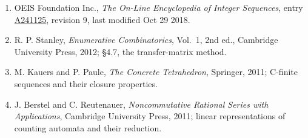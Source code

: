 \documentclass[11pt]{article}
\theoremstyle{definition}
\begin{document}
\begin{enumerate}

\item OEIS Foundation Inc., \emph{The On-Line Encyclopedia of Integer Sequences}, entry \href{https://oeis.org/A241125}{A241125}, revision 9, last modified Oct 29 2018.

\item R. P. Stanley, \emph{Enumerative Combinatorics}, Vol.~1, 2nd ed., Cambridge University Press, 2012; \S4.7, the transfer-matrix method.

\item M. Kauers and P. Paule, \emph{The Concrete Tetrahedron}, Springer, 2011; C-finite sequences and their closure properties.

\item J. Berstel and C. Reutenauer, \emph{Noncommutative Rational Series with Applications}, Cambridge University Press, 2011; linear representations of counting automata and their reduction.

\end{enumerate}
\end{document}
